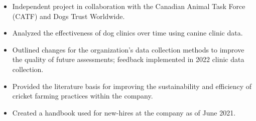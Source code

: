 \documentclass[10pt,a4paper,ragged2e]{altacv}
\begin{document}

\begin{fullwidth}
\makecvheader
\end{fullwidth}




\begin{itemize}
\item Independent project in collaboration with the Canadian Animal Task Force (CATF) and Dogs Trust Worldwide.
\item Analyzed the effectiveness of dog clinics over time using canine clinic data.
\item Outlined changes for the organization's data collection methods to improve the quality of future assessments; feedback implemented in 2022 clinic data collection.
\end{itemize}
\divider\small

\begin{itemize}
\item Provided the literature basis for improving the sustainability and efficiency of cricket farming practices within the company.
\item Created a handbook used for new-hires at the company as of June 2021.
\end{itemize} 
\end{document}
